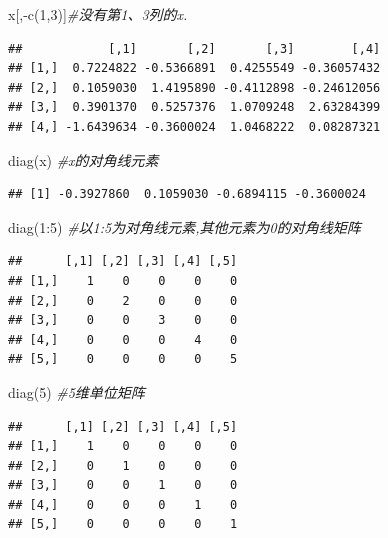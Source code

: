 \documentclass[
]{book}
\newenvironment{Shaded}{\begin{snugshade}}{\end{snugshade}}
\newcommand{\CommentTok}[1]{\textcolor[rgb]{0.56,0.35,0.01}{\textit{#1}}}
\newcommand{\DecValTok}[1]{\textcolor[rgb]{0.00,0.00,0.81}{#1}}
\newcommand{\FunctionTok}[1]{\textcolor[rgb]{0.00,0.00,0.00}{#1}}
\newcommand{\NormalTok}[1]{#1}
\newcommand{\SpecialCharTok}[1]{\textcolor[rgb]{0.00,0.00,0.00}{#1}}
\begin{document}
\begin{Shaded}
\begin{Highlighting}[]
\NormalTok{x[,}\SpecialCharTok{{-}}\FunctionTok{c}\NormalTok{(}\DecValTok{1}\NormalTok{,}\DecValTok{3}\NormalTok{)]}\CommentTok{\#没有第1、3列的x.}
\end{Highlighting}
\end{Shaded}

\begin{verbatim}
##            [,1]       [,2]       [,3]        [,4]
## [1,]  0.7224822 -0.5366891  0.4255549 -0.36057432
## [2,]  0.1059030  1.4195890 -0.4112898 -0.24612056
## [3,]  0.3901370  0.5257376  1.0709248  2.63284399
## [4,] -1.6439634 -0.3600024  1.0468222  0.08287321
\end{verbatim}

\begin{Shaded}
\begin{Highlighting}[]
\FunctionTok{diag}\NormalTok{(x)  }\CommentTok{\#x的对角线元素}
\end{Highlighting}
\end{Shaded}

\begin{verbatim}
## [1] -0.3927860  0.1059030 -0.6894115 -0.3600024
\end{verbatim}

\begin{Shaded}
\begin{Highlighting}[]
\FunctionTok{diag}\NormalTok{(}\DecValTok{1}\SpecialCharTok{:}\DecValTok{5}\NormalTok{) }\CommentTok{\#以1:5为对角线元素,其他元素为0的对角线矩阵}
\end{Highlighting}
\end{Shaded}

\begin{verbatim}
##      [,1] [,2] [,3] [,4] [,5]
## [1,]    1    0    0    0    0
## [2,]    0    2    0    0    0
## [3,]    0    0    3    0    0
## [4,]    0    0    0    4    0
## [5,]    0    0    0    0    5
\end{verbatim}

\begin{Shaded}
\begin{Highlighting}[]
\FunctionTok{diag}\NormalTok{(}\DecValTok{5}\NormalTok{) }\CommentTok{\#5维单位矩阵}
\end{Highlighting}
\end{Shaded}

\begin{verbatim}
##      [,1] [,2] [,3] [,4] [,5]
## [1,]    1    0    0    0    0
## [2,]    0    1    0    0    0
## [3,]    0    0    1    0    0
## [4,]    0    0    0    1    0
## [5,]    0    0    0    0    1
\end{verbatim}
\end{document}
